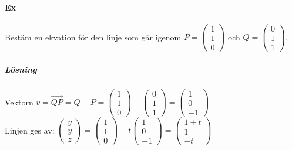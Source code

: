 
\paragraph{Ex} Bestäm en ekvation för den linje som går igenom $P=\begin{pmatrix}1\\1\\0\end{pmatrix}$ och $Q=\begin{pmatrix}0\\1\\1\end{pmatrix}$.
\subparagraph{Lösning} 
Vektorn $v=\overrightarrow{QP}=Q-P=\begin{pmatrix}1\\1\\0\end{pmatrix}-\begin{pmatrix}0\\1\\1\end{pmatrix}=\begin{pmatrix}1\\0\\-1\end{pmatrix}$\\
Linjen ges av: $\begin{pmatrix}y\\y\\z\end{pmatrix}=\begin{pmatrix}1\\1\\0\end{pmatrix}+t\begin{pmatrix}1\\0\\-1\end{pmatrix}=\begin{pmatrix}1+t\\1\\-t\end{pmatrix}$


